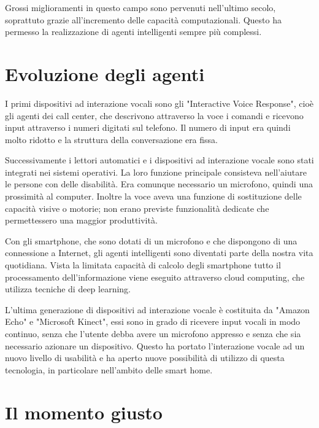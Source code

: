 \documentclass[twoside]{supsistudent}
\begin{document}
Grossi miglioramenti in questo campo sono pervenuti nell'ultimo secolo, soprattuto grazie all'incremento delle capacità computazionali. Questo ha permesso la realizzazione di agenti intelligenti sempre più complessi.

\section{Evoluzione degli agenti}

I primi dispositivi ad interazione vocali sono gli "Interactive Voice Response", cioè gli agenti dei call center, che descrivono attraverso la voce i comandi e ricevono input attraverso i numeri digitati sul telefono. Il numero di input era quindi molto ridotto e la struttura della conversazione era fissa.

Successivamente i lettori automatici e i dispositivi ad interazione vocale sono stati integrati nei sistemi operativi. La loro funzione principale consisteva nell'aiutare le persone con delle disabilità. Era comunque necessario un microfono, quindi una prossimità al computer. Inoltre la voce aveva una funzione di sostituzione delle capacità visive o motorie; non erano previste funzionalità dedicate che permettessero una maggior produttività.

Con gli smartphone, che sono dotati di un microfono e che dispongono di una connessione a Internet, gli agenti intelligenti sono diventati parte della nostra vita quotidiana. Vista la limitata capacità di calcolo degli smartphone tutto il processamento dell'informazione viene eseguito attraverso cloud computing, che utilizza tecniche di deep learning. \cite{deeplearninggeneral}

L'ultima generazione di dispositivi ad interazione vocale è costituita da "Amazon Echo" e "Microsoft Kinect", essi sono in grado di ricevere input vocali in modo continuo, senza che l'utente debba avere un microfono appresso e senza che sia necessario azionare un dispositivo. Questo ha portato l'interazione vocale ad un nuovo livello di usabilità e ha aperto nuove possibilità di utilizzo di questa tecnologia, in particolare nell'ambito delle smart home.

\section{Il momento giusto}
\end{document}
